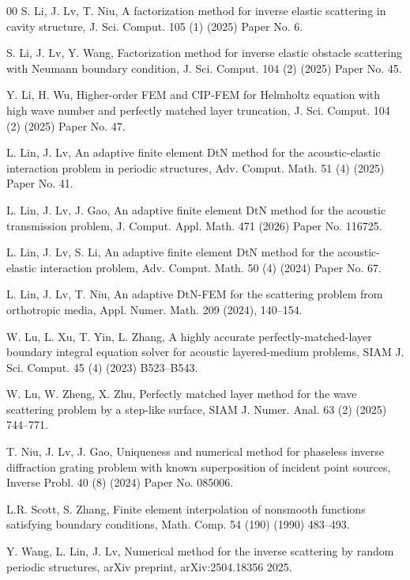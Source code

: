 \documentclass[final,3p,times]{elsarticle}
\begin{document}
\begin{thebibliography}{00}
 S. Li, J. Lv, T. Niu, A factorization method for inverse elastic scattering in cavity structure, J. Sci. Comput. 105 (1) (2025) Paper No. 6.

 S. Li, J. Lv, Y. Wang,  Factorization method for inverse elastic obstacle scattering with Neumann boundary condition, J. Sci. Comput. 104 (2) (2025) Paper No. 45.  

 Y. Li, H. Wu, Higher-order FEM and CIP-FEM for Helmholtz equation with high wave number and perfectly matched layer truncation, J. Sci. Comput. 104 (2) (2025) Paper No. 47.

  L. Lin, J. Lv, An adaptive finite element DtN method for the acoustic-elastic interaction problem in periodic structures, Adv. Comput. Math. 51 (4)  (2025) Paper No. 41.

 L. Lin, J. Lv, J. Gao, An adaptive finite element DtN method for the acoustic transmission problem, J. Comput. Appl. Math. 471 (2026) Paper No. 116725.

  L. Lin, J. Lv, S. Li, An adaptive finite element DtN method for the acoustic-elastic interaction problem, Adv. Comput. Math. 50 (4)  (2024) Paper No. 67.

 L. Lin, J. Lv, T. Niu, An adaptive DtN-FEM for the scattering problem from orthotropic media, Appl. Numer. Math. 209 (2024), 140--154.

 W. Lu, L. Xu, T. Yin, L. Zhang, A highly accurate perfectly-matched-layer boundary integral equation solver for acoustic layered-medium problems, SIAM J. Sci. Comput. 45 (4)  (2023) B523--B543.

 W. Lu, W. Zheng, X. Zhu, Perfectly matched layer method for the wave scattering problem by a step-like surface, SIAM J. Numer. Anal. 63 (2) (2025) 744--771.

 T. Niu, J. Lv, J. Gao, Uniqueness and numerical method for phaseless inverse diffraction grating problem with known superposition of incident point sources, Inverse Probl. 40 (8) (2024) Paper No. 085006.



 L.R. Scott, S. Zhang, Finite element interpolation of nonsmooth functions satisfying boundary conditions, Math. Comp. 54 (190) (1990) 483--493. 

 Y. Wang, L. Lin, J. Lv,  Numerical method for the inverse scattering by random periodic structures, arXiv preprint, arXiv:2504.18356 2025.


\end{thebibliography}
\end{document}
